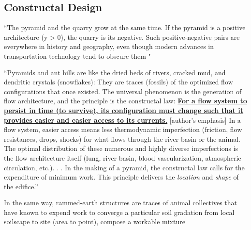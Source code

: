 \subsection{Constructal Design}

``The pyramid and the quarry grow at the same time. If the pyramid is a positive architecture (y > 0), the quarry is its negative. Such positive-negative pairs are everywhere in history and geography, even though modern advances in transportation technology tend to obscure them "

``Pyramids and ant hills are like the dried beds of rivers, cracked mud, and dendritic crystals (snowflakes): They are traces (fossils) of the optimized flow configurations that once existed. The universal phenomenon is the generation of flow architecture, and the principle is the constructal law: \textbf{\underline{For a flow system to persist in time (to survive), its configuration must change such that it provides easier and easier access to its currents.}} [author's emphasis] In a flow system, easier access means less thermodynamic imperfection (friction, flow resistances, drops, shocks) for what flows through the river basin or the animal. The optimal distribution of these numerous and highly diverse imperfections is the flow architecture itself (lung, river basin, blood vascularization, atmospheric circulation, etc.). . . In the making of a pyramid, the constructal law calls for the expenditure of minimum work. This principle delivers the \textit{location} and \textit{shape} of the edifice.''

In the same way, rammed-earth structures are traces of animal collectives that have known to expend work to converge a particular soil gradation from local soilscape to site (area to point), compose a workable mixture
